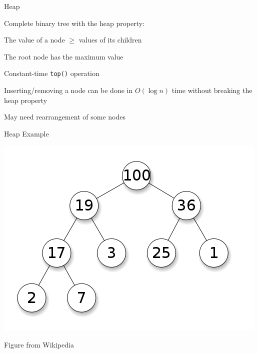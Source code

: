\documentclass[13pt,onlymath]{beamer}
\begin{document}
\begin{frame}[fragile]{Heap}
\BIT
\item Complete binary tree with the heap property:
\BIT
\item The value of a node $\ge$ values of its children
\EIT
\item The root node has the maximum value
\BIT
\item Constant-time \verb,top(), operation
\EIT
\item Inserting/removing a node can be done in $O(\log n)$ time without breaking the heap property
\BIT
\item May need rearrangement of some nodes
\EIT
\EIT
\end{frame}

\begin{frame}{Heap Example}
\begin{center}
\includegraphics[height=0.5\textheight]{figures/heap.png}

Figure from Wikipedia
\end{center}
\end{frame}
\end{document}
